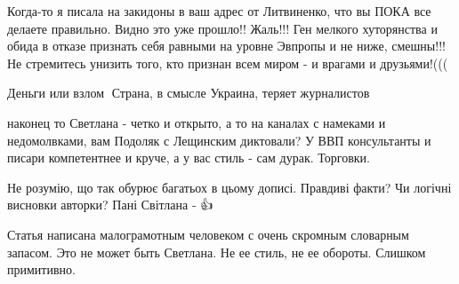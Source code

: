 \begin{itemize}
 

Когда-то я писала на закидоны в ваш адрес от Литвиненко, что вы ПОКА все
делаете правильно. Видно это уже прошло!! Жаль!!! Ген мелкого хуторянства и
обида в отказе признать себя равными на уровне Эвпропы и не ниже, смешны!!! Не
стремитесь унизить того, кто признан всем миром - и врагами и друзьями!(((

 
Деньги или взлом🤔
Страна, в смысле Украина, теряет журналистов🤒🤑

 
наконец то Светлана - четко и открыто, а то на каналах с намеками и недомолвками, вам Подоляк с Лещинским диктовали? У ВВП консультанты и писари компетентнее и круче, а у вас стиль - сам дурак. Торговки.

 

Не розумію, що так обурює багатьох в цьому дописі.
Правдиві факти? Чи логічні висновки авторки?
Пані Світлана - 👍

 
Статья написана малограмотным человеком с очень скромным словарным запасом. Это не может быть Светлана. Не ее стиль, не ее обороты. Слишком примитивно.

 

\end{itemize}
